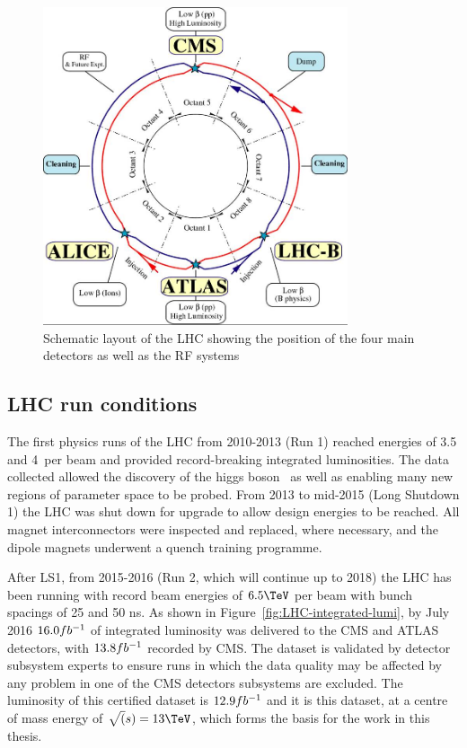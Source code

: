 \begin{figure}
\centering
    \includegraphics[width=0.8\textwidth]{./Figures/detector/lhcDiagram}
  \caption{Schematic layout of the LHC showing the position of the four main detectors as
  well as the RF systems}
  \label{fig:LHC-diagram}
\end{figure}

\subsection{LHC run conditions}

The first physics runs of the LHC from 2010-2013 (Run 1) reached energies of 3.5 and 4\TeV~per beam and 
provided record-breaking integrated luminosities. The data collected allowed the 
discovery of the higgs boson~\cite{higgs} as well as enabling many new regions of parameter space
to be probed. From 2013 to mid-2015 (Long Shutdown 1) the LHC was shut down for upgrade to allow design
energies to be reached. All magnet interconnectors were inspected and replaced, where necessary,
and the dipole magnets underwent a quench training programme. 

After LS1, from 2015-2016 (Run 2, which will continue up to 2018) the LHC has been running with record beam energies 
of $6.5\TeV$ per beam with bunch spacings of 25 and 50 ns. 
As shown in Figure~\ref{fig:LHC-integrated-lumi}, by July 2016 $16.0fb^{-1}$ of integrated luminosity was
delivered to the CMS and ATLAS detectors, with $13.8fb^{-1}$ recorded by CMS. The dataset is validated by detector
subsystem experts to ensure runs in which the data quality may be affected by any problem in one of the CMS detectors 
subsystems are excluded. The luminosity of this certified dataset is $12.9fb^{-1}$ and it is this dataset, 
at a centre of mass energy of $\sqrt(s) = 13\TeV$, which forms the basis for the work in this thesis.

